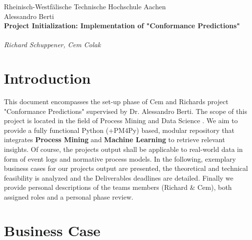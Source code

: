 \documentclass[12pt,a4paper]{article}
\begin{document}
\thispagestyle{empty}
\begin{center}
Rheinisch-Westf\"alische Technische Hochschule Aachen \\
Alessandro Berti\\[6ex]

\LARGE
	\textbf{Project Initialization: Implementation of "Conformance Predictions"} \\[6ex]
        \\
	\textit{Richard Schuppener, Cem Colak} \\[6ex]
\end{center}

\newpage

\tableofcontents

\section{Introduction}
This document encompasses the set-up phase of Cem and Richards project "Conformance Predictions" supervised by Dr. Alessandro Berti. The scope of this project is located in the field of Process Mining and Data Science \cite{vanderaalst2016}. We aim to provide a fully functional Python (+PM4Py) based, modular repository that integrates \textbf{Process Mining} and \textbf{Machine Learning} to retrieve relevant insights. Of course, the projects output shall be applicable to real-world data in form of event logs and normative process models.
In the following, exemplary business cases for our projects output are presented, the theoretical and technical feasibility is analyzed and the Deliverables deadlines are detailed. Finally we provide personal descriptions of the teams members (Richard \& Cem), both assigned roles and a personal phase review.

\section{Business Case} 
\end{document}
